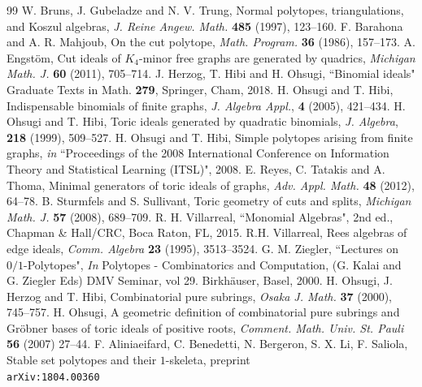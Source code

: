 \documentclass[10pt,a4paper]{amsart}
\numberwithin{thm}{section}
\numberwithin{equation}{section}
\begin{document}
\begin{thebibliography}{99}
 W. Bruns, J. Gubeladze and N. V. Trung, Normal polytopes, triangulations, and Koszul algebras, {\it J. Reine Angew. Math.} {\bf 485} (1997), 123--160.
 F. Barahona and A. R. Mahjoub, On the cut polytope, {\it Math. Program.} {\bf 36} (1986), 157--173.
 A. Engst\"{o}m, Cut ideals of $K_4$-minor free graphs are generated by quadrics, \textit{Michigan Math. J.} {\bf 60} (2011), 705--714.
 J. Herzog, T. Hibi and H. Ohsugi, ``Binomial ideals" Graduate Texts in Math. {\bf 279}, Springer, Cham, 2018.
 H. Ohsugi and T. Hibi, Indispensable binomials of finite graphs, \textit{J. Algebra Appl.}, {\bf 4} (2005), 421--434.
 H. Ohsugi and T. Hibi, Toric ideals generated by quadratic binomials, \textit{J. Algebra}, {\bf 218} (1999), 509--527.
 H. Ohsugi and T. Hibi, Simple polytopes arising from finite graphs, {\it in} ``Proceedings of the 2008 International Conference on Information Theory and Statistical Learning (ITSL)", 2008. %
 E. Reyes, C. Tatakis and A. Thoma, Minimal generators of toric ideals of graphs, {\it Adv. Appl. Math.} {\bf 48} (2012), 64--78.
 B. Sturmfels and S. Sullivant, Toric geometry of cuts and splits, \textit{Michigan Math. J.} {\bf 57} (2008), 689--709.
 R. H. Villarreal, ``Monomial Algebras", 2nd ed., Chapman \& Hall/CRC, Boca Raton, FL, 2015.
 R.H. Villarreal, Rees algebras of edge ideals, {\it Comm. Algebra} {\bf 23} (1995), 3513--3524.
 G. M. Ziegler, ``Lectures on $0/1$-Polytopes", {\it In} Polytopes - Combinatorics and Computation, (G. Kalai and G. Ziegler Eds) DMV Seminar, vol 29. Birkh\"{a}user, Basel, 2000.
 H. Ohsugi, J. Herzog and T. Hibi, Combinatorial pure subrings, \textit{Osaka J. Math.} {\bf 37} (2000), 745--757.
 H. Ohsugi, A geometric definition of combinatorial pure subrings and Gr\"obner bases of toric ideals of positive roots, {\it Comment. Math. Univ. St. Pauli} {\bf 56} (2007) 27--44.
 F. Aliniaeifard, C. Benedetti, N. Bergeron, S. X. Li, F. Saliola, Stable set polytopes and their $1$-skeleta, preprint\\ {\tt arXiv:1804.00360}
\end{thebibliography}
\end{document}
